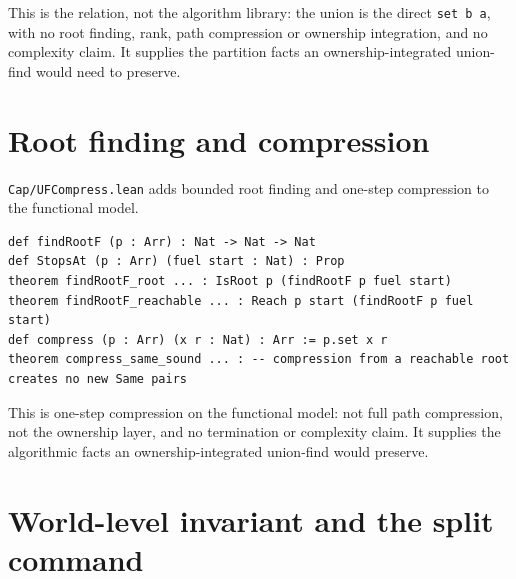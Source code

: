 \documentclass[10pt,a4paper]{article}
\newcommand{\file}[1]{\texttt{\small #1}}
\begin{document}
This is the relation, not the algorithm library: the union is the direct
\texttt{set b a}, with no root finding, rank, path compression or ownership
integration, and no complexity claim. It supplies the partition facts an
ownership-integrated union-find would need to preserve.

\section{Root finding and compression}

\file{Cap/UFCompress.lean} adds bounded root finding and one-step compression to
the functional model.

\begin{lstlisting}[caption={\file{Cap/UFCompress.lean}.}]
def findRootF (p : Arr) : Nat -> Nat -> Nat
def StopsAt (p : Arr) (fuel start : Nat) : Prop
theorem findRootF_root ... : IsRoot p (findRootF p fuel start)
theorem findRootF_reachable ... : Reach p start (findRootF p fuel start)
def compress (p : Arr) (x r : Nat) : Arr := p.set x r
theorem compress_same_sound ... : -- compression from a reachable root creates no new Same pairs
\end{lstlisting}

This is one-step compression on the functional model: not full path compression,
not the ownership layer, and no termination or complexity claim. It supplies the
algorithmic facts an ownership-integrated union-find would preserve.

\section{World-level invariant and the split command}
\end{document}
